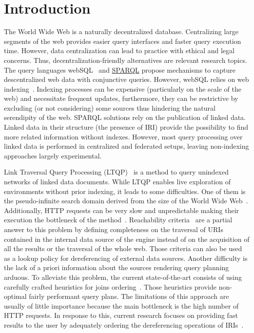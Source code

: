 \section{Introduction}

The World Wide Web is a naturally decentralized database.
Centralizing large segments of the web provides easier query interfaces and faster query execution time.
However, data centralization can lead to practice with ethical and legal concerns.
Thus, decentralization-friendly alternatives are relevant research topics.
The query languages webSQL~\cite{Mendelzon1996} and \href{https://www.w3.org/TR/sparql11-query/}{SPARQL} propose mechanisms to capture descentralized web data with conjunctive queries.
However, webSQL relies on web indexing~\cite{Mendelzon1996}.
Indexing processes can be expensive (particularly on the scale of the web) and necessitate frequent updates, furthermore, they can be restrictive by excluding (or not considering) some sources thus hindering the natural serendipity of the web.
SPARQL solutions rely on the publication of linked data.
Linked data in their structure (the presence of IRI) provide the possibility to find more related information without indexes.
However, most query processing over linked data is performed in centralized and federated setups, leaving non-indexing approaches largely experimental.

Link Traversal Query Processing (LTQP)~\cite{Hartig2012} is a method to query unindexed networks of linked data documents.
While LTQP enables live exploration of environments without prior indexing, it leads to some difficulties.
One of them is the pseudo-infinite search domain derived from the size of the World Wide Web~\cite{hartig2016walking}.
Additionally, HTTP requests can be very slow and unpredictable making their execution the bottleneck of the method~\cite{hartig2016walking}.
Reachability criteria~\cite{Hartig2012} are a partial answer to this problem by defining completeness on the traversal of URIs
contained in the internal data source of the engine instead of on the acquisition of all the results or the traversal of the whole web.
Those criteria can also be used as a lookup policy for dereferencing of external data sources.
Another difficulty is the lack of a priori information about the sources rendering query planning arduous.
To alleviate this problem, the current state-of-the-art consists of using carefully crafted heuristics for joins ordering~\cite{Hartig2011}.
Those heuristics provide non-optimal fairly performant query plans.
The limitations of this approach are usually of little importance because the main bottleneck is the high number of HTTP requests.
In response to this, current research focuses on providing fast results to the user by adequately ordering the dereferencing operations of IRIs~\cite{hartig2016walking}.


